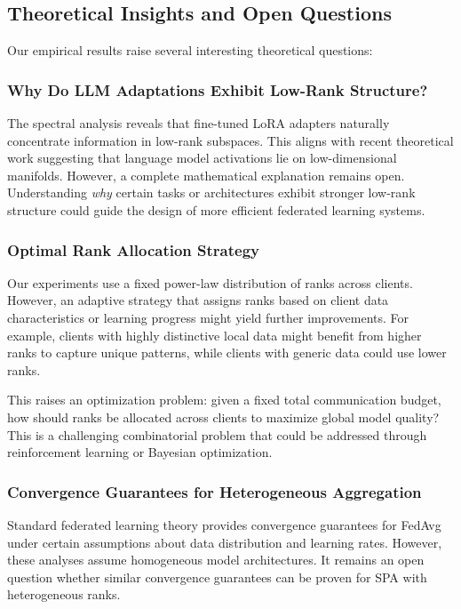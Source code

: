 \documentclass[conference]{IEEEtran}
\begin{document}
\subsection{Theoretical Insights and Open Questions}

Our empirical results raise several interesting theoretical questions:

\subsubsection{Why Do LLM Adaptations Exhibit Low-Rank Structure?}

The spectral analysis reveals that fine-tuned LoRA adapters naturally concentrate information in low-rank subspaces. This aligns with recent theoretical work suggesting that language model activations lie on low-dimensional manifolds. However, a complete mathematical explanation remains open. Understanding \textit{why} certain tasks or architectures exhibit stronger low-rank structure could guide the design of more efficient federated learning systems.

\subsubsection{Optimal Rank Allocation Strategy}

Our experiments use a fixed power-law distribution of ranks across clients. However, an adaptive strategy that assigns ranks based on client data characteristics or learning progress might yield further improvements. For example, clients with highly distinctive local data might benefit from higher ranks to capture unique patterns, while clients with generic data could use lower ranks.

This raises an optimization problem: given a fixed total communication budget, how should ranks be allocated across clients to maximize global model quality? This is a challenging combinatorial problem that could be addressed through reinforcement learning or Bayesian optimization.

\subsubsection{Convergence Guarantees for Heterogeneous Aggregation}

Standard federated learning theory provides convergence guarantees for FedAvg under certain assumptions about data distribution and learning rates. However, these analyses assume homogeneous model architectures. It remains an open question whether similar convergence guarantees can be proven for SPA with heterogeneous ranks.
\end{document}
